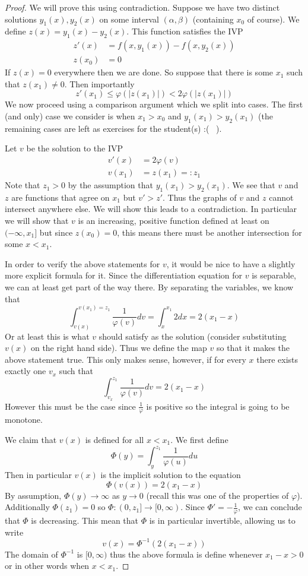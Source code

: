 \begin{proof}
    We will prove this using contradiction. Suppose we have two distinct solutions $y_1(x), y_2(x)$ on some interval $(\alpha, \beta)$ (containing $x_0$ of course). We define $z(x) = y_1(x) - y_2(x)$. This function satisfies the IVP
    \begin{align*}
        z'(x) &= f(x, y_1(x)) - f(x, y_2(x))\\
        z(x_0) &= 0
    \end{align*}
    If $z(x) = 0$ everywhere then we are done. So suppose that there is some $x_1$ such that $z(x_1) \neq 0$. Then importantly
    $$ z'(x_1) \leq \varphi(|z(x_1)|) < 2 \varphi(|z(x_1)|) $$
    We now proceed using a comparison argument which we split into cases. The first (and only) case we consider is when $x_1 > x_0$ and $y_1(x_1) > y_2(x_1)$ (the remaining cases are left as exercises for the student(s) :( \ ).
    
    Let $v$ be the solution to the IVP
    \begin{align*}
        v'(x) &= 2 \varphi(v)\\
        v(x_1) &= z(x_1) =: z_1
    \end{align*}
    Note that $z_1 > 0$ by the assumption that $y_1(x_1) > y_2(x_1)$.
    We see that $v$ and $z$ are functions that agree on $x_1$ but $v' > z'$. Thus the graphs of $v$ and $z$ cannot intersect anywhere else. We will show this leads to a contradiction. In particular we will show that $v$ is an increasing, positive function defined at least on $(-\infty, x_1]$ but since $z(x_0) = 0$, this means there must be another intersection for some $x < x_1$.
    
    In order to verify the above statements for $v$, it would be nice to have a slightly more explicit formula for it. Since the differentiation equation for $v$ is separable, we can at least get part of the way there.
    By separating the variables, we know that
    $$ \int_{v(x)}^{v(x_1) = z_1} \frac{1}{\varphi(v)} dv = \int_{x}^{x_1} 2 dx = 2(x_1 - x) $$
    Or at least this is what $v$ should satisfy as the solution (consider substituting $v(x)$ on the right hand side). Thus we define the map $v$ so that it makes the above statement true. This only makes sense, however, if for every $x$ there exists exactly one $v_x$ such that
    $$ \int_{v_x}^{z_1} \frac{1}{\varphi(v)} dv = 2(x_1 - x) $$
    However this must be the case since $\frac{1}{\varphi}$ is positive so the integral is going to be monotone.
    
    We claim that $v(x)$ is defined for all $x < x_1$. We first define
    $$ \Phi(y) = \int_{y}^{z_1} \frac{1}{\varphi(u)} du $$
    Then in particular $v(x)$ is the implicit solution to the equation
    $$ \Phi(v(x)) = 2(x_1 - x) $$
    By assumption, $\Phi(y) \to \infty$ as $y \to 0$ (recall this was one of the properties of $\varphi$). Additionally $\Phi(z_1) = 0$ so $\Phi: (0, z_1] \to [0, \infty)$. Since
    $\Phi' = -\frac{1}{\varphi}$, we can conclude that $\Phi$ is decreasing. This mean that $\Phi$ is in particular invertible, allowing us to write
    $$ v(x) = \Phi^{-1}(2(x_1 - x)) $$
    The domain of $\Phi^{-1}$ is $[0, \infty)$ thus the above formula is define whenever $x_1 - x > 0$ or in other words when $x < x_1$. 
    

\end{proof}
